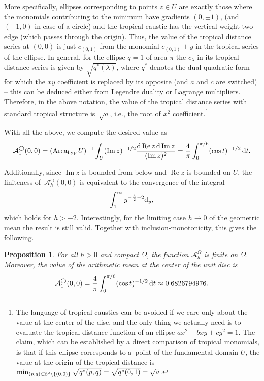 \documentclass[pdftex]{sigma}
\numberwithin{equation}{section}
\newtheorem{Proposition}[Theorem]{Proposition}
\theoremstyle{definition}
\begin{document}
More specifically, ellipses corresponding to points $z\in U$ are exactly those where the monomials contributing to the minimum have gradients $(0, \pm 1)$, (and $(\pm 1,0)$ in case of a circle) and the tropical caustic has the vertical weight two edge (which passes through the origin). Thus, the value of the tropical distance series at $(0,0)$ is just $c_{(0,1)}$ from the monomial $c_{(0,1)}+y$ in the tropical series of the ellipse. In general, for the ellipse $q=1$ of area $\pi$ the $c_\lambda$ in its tropical distance series is given by $\sqrt{q^*(\lambda)}$, where $q^*$ denotes the dual quadratic form for which the $xy$ coefficient is replaced by its opposite (and $a$ and $c$ are switched) -- this can be deduced either from Legendre duality or Lagrange multipliers. Therefore, in the above notation, the value of the tropical distance series with standard tropical structure is~$\sqrt{a}$, i.e., the root of $x^2$ coefficient.\footnote{The language of tropical caustics can be avoided if we care only about the value at the center of the disc, and the only thing we actually need is to evaluate the tropical distance function of an ellipse $ax^2+bxy+cy^2=1$. The claim, which can be established by a direct comparison of tropical monomials, is that if this ellipse corresponds to a~point of the fundamental domain $U$, the value at the origin of the tropical distance is $\min_{(p,q)\in \mathbb{Z}^2\backslash\{(0,0)\}}\smash{\sqrt{q^*(p,q)}}=\smash{\sqrt{q^*(0,1)}=\sqrt{a}}$.}

With all the above, we compute the desired value as
\[
\mathcal{A}_1^\bigcirc(0,0)
=
(\operatorname{Area}_{\mathrm{hyp}} U)^{-1}
\int_U
(\operatorname{Im} z)^{-1/2}
\frac{{\rm d}\operatorname{Re} z\, {\rm d}\operatorname{Im} z}{(\operatorname{Im} z)^2}
=
\frac{4}{\pi}
\int_0^{\pi/6}
(\cos t)^{-1/2}\,{\rm d}t.
\]

Additionally, since $\operatorname{Im} z$ is bounded from below and $\operatorname{Re} z$ is bounded on $U$, the finiteness of~$\mathcal{A}_h^\bigcirc(0,0)$ is equivalent to the convergence of the integral
\[
\int_1^{\infty} y^{-\frac{h}{2}-2} {\rm d}_y,
\] which holds for $h>-2$. Interestingly, for the limiting case $h\rightarrow 0$ of the geometric mean the result is still valid. Together with inclusion-monotonicity, this gives the following.

\begin{Proposition}
For all $h>0$ and compact $\Omega$, the function $\mathcal{A}_h^\Omega$ is finite on $\Omega$. Moreover, the value of the arithmetic mean at the center of the unit disc is
\[\mathcal{A}_1^\bigcirc(0,0)=
\frac{4}{\pi}
\int_0^{\pi/6}
(\cos t)^{-1/2}\,{\rm d}t
\approx 0.6826794976.
\]
\end{Proposition}
\end{document}

